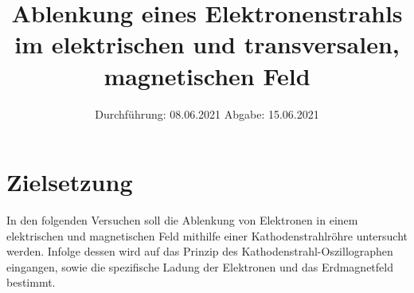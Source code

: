 
\usepackage{parskip}

\subject{V501, V502}
\title{Ablenkung eines Elektronenstrahls im elektrischen und transversalen, magnetischen Feld}
\date{
    Durchführung: 08.06.2021
    \hspace{3em}
    Abgabe: 15.06.2021
}



\maketitle
\thispagestyle{empty}
\tableofcontents
\newpage

\section{Zielsetzung}

    In den folgenden Versuchen soll die Ablenkung von Elektronen in einem elektrischen und magnetischen Feld mithilfe einer Kathodenstrahlröhre untersucht werden.
    Infolge dessen wird auf das Prinzip des Kathodenstrahl-Oszillographen eingangen,
    sowie die spezifische Ladung der Elektronen und das Erdmagnetfeld bestimmt.
    

\clearpage


\clearpage

%

%

\printbibliography


